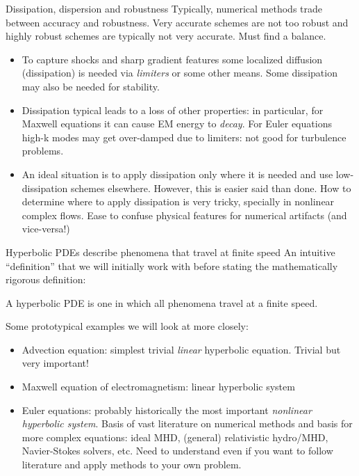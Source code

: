 \documentclass[aspectratio=169]{beamer}
\newcommand{\mypause}{}
\theoremstyle{definition}
\begin{document}
\begin{frame}{Dissipation, dispersion and robustness}
  Typically, numerical methods trade between accuracy and
  robustness. Very accurate schemes are not too robust and highly
  robust schemes are typically not very accurate. Must find a balance.
  \mypause%
  \begin{itemize}
  \item To capture shocks and sharp gradient features some localized
    diffusion (dissipation) is needed via \emph{limiters} or some
    other means. Some dissipation may also be needed for stability.
  \item Dissipation typical leads to a loss of other properties: in
    particular, for Maxwell equations it can cause EM energy to
    \emph{decay}. For Euler equations high-k modes may get over-damped
    due to limiters: not good for turbulence problems.%
    \mypause%
  \item An ideal situation is to apply dissipation only where it is
    needed and use low-dissipation schemes elsewhere. However, this is
    easier said than done. How to determine where to apply dissipation
    is very tricky, specially in nonlinear complex flows. Ease to
    confuse physical features for numerical artifacts (and
    vice-versa!)
  \end{itemize}
\end{frame}

\begin{frame}{Hyperbolic PDEs describe phenomena that travel at finite
    speed}
  \small%
  An intuitive ``definition'' that we will initially work with before
  stating the mathematically rigorous definition:
  \begin{definition}
    A hyperbolic PDE is one in which all phenomena travel at a finite
    speed.
  \end{definition}

  \mypause%
  \vskip0.1in%
  Some prototypical examples we will look at more closely:
  \begin{itemize}
  \item Advection equation: simplest trivial \emph{linear} hyperbolic
    equation. Trivial but very important!
  \item Maxwell equation of electromagnetism: linear hyperbolic system
  \item Euler equations: probably historically the most important
    \emph{nonlinear hyperbolic system}. Basis of vast literature on
    numerical methods and basis for more complex equations: ideal MHD,
    (general) relativistic hydro/MHD, Navier-Stokes solvers, etc. Need
    to understand even if you want to follow literature and apply
    methods to your own problem.
  \end{itemize}
  
\end{frame}
\end{document}
